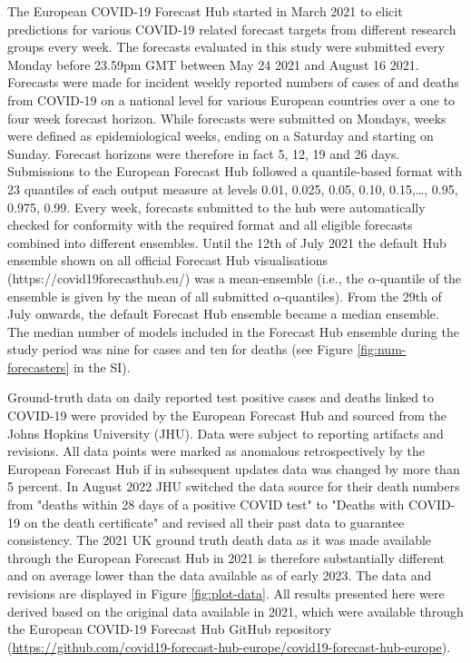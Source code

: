 \documentclass[10pt,a4paper,twocolumn]{article}
\begin{document}
The European COVID-19 Forecast Hub \cite{sherrattPredictivePerformanceMultimodel2022a} started in March 2021 to elicit predictions for various COVID-19 related forecast targets from different research groups every week. The forecasts evaluated in this study were submitted every Monday before 23.59pm GMT between May 24 2021 and August 16 2021. Forecasts were made for incident weekly reported numbers of cases of and deaths from COVID-19 on a national level for various European countries over a one to four week forecast horizon. While forecasts were submitted on Mondays, weeks were defined as epidemiological weeks, ending on a Saturday and starting on Sunday. Forecast horizons were therefore in fact 5, 12, 19 and 26 days. Submissions to the European Forecast Hub followed a quantile-based format with 23 quantiles of each output measure at levels 0.01, 0.025, 0.05, 0.10, 0.15,…, 0.95, 0.975, 0.99.
Every week, forecasts submitted to the hub were automatically checked for conformity with the required format and all eligible forecasts combined into different ensembles. Until the 12th of July 2021 the default Hub ensemble shown on all official Forecast Hub visualisations (https://covid19forecasthub.eu/) was a mean-ensemble (i.e., the $\alpha$-quantile of the ensemble is given by the mean of all submitted $\alpha$-quantiles). From the 29th of July onwards, the default Forecast Hub ensemble became a median ensemble. The median number of models included in the Forecast Hub ensemble during the study period was nine for cases and ten for deaths (see Figure \ref{fig:num-forecasters} in the SI). 

Ground-truth data on daily reported test positive cases and deaths linked to COVID-19 were provided by the European Forecast Hub and sourced from the Johns Hopkins University (JHU). Data were subject to reporting artifacts and revisions. All data points were marked as anomalous retrospectively by the European Forecast Hub if in subsequent updates data was changed by more than 5 percent. In August 2022 JHU switched the data source for their death numbers from "deaths within 28 days of a positive COVID test" to "Deaths with COVID-19 on the death certificate" and revised all their past data to guarantee consistency. The 2021 UK ground truth death data as it was made available through the European Forecast Hub in 2021 is therefore substantially different and on average lower than the data available as of early 2023. The data and revisions are displayed in Figure \ref{fig:plot-data}. All results presented here were derived based on the original data available in 2021, which were available through the European COVID-19 Forecast Hub GitHub repository (\url{https://github.com/covid19-forecast-hub-europe/covid19-forecast-hub-europe}). 
\end{document}
